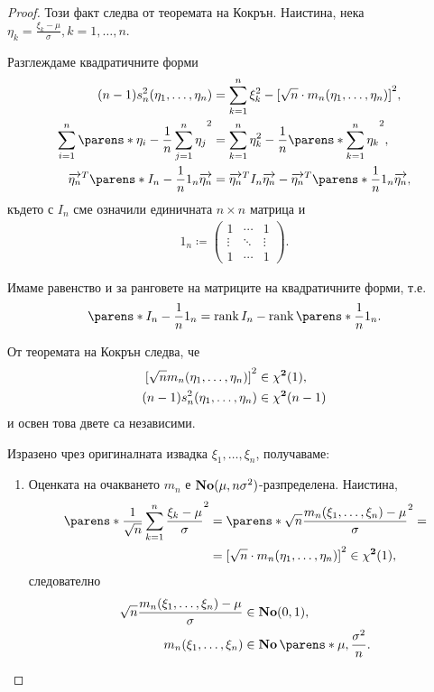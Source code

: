 \documentclass{../../common/topic}
\begin{document}
\begin{proof}
  Този факт следва от теоремата на Кокрън. Наистина, нека \( \eta_k = \frac {\xi_k - \mu} \sigma, k = 1, \ldots, n \).

  Разглеждаме квадратичните форми
  \begin{align*}
    (n-1) s_n^2(\eta_1, \ldots, \eta_n)
    &=
    \sum_{k=1}^n \xi_k^2 - {[\sqrt n \cdot m_n(\eta_1, \ldots, \eta_n)]}^2,
    \\
    \sum_{i=1}^n {\parens*{\eta_i - \frac 1 n \sum_{j=1}^n \eta_j }}^2
    &=
    \sum_{k=1}^n \eta_k^2 - \frac 1 n {\parens*{\sum_{k=1}^n \eta_k }}^2,
    \\
    \vect{\eta_n}^T \parens*{I_n - \frac 1 n 1_n } \vect{\eta_n}
    &=
    \vect{\eta_n}^T I_n \vect{\eta_n} - \vect{\eta_n}^T \parens*{\frac 1 n 1_n } \vect{\eta_n},
  \end{align*}
  където с \( I_n \) сме означили единичната \( n \times n \) матрица и
  \begin{align*}
    1_n
    \coloneqq
    \begin{pmatrix}
      1 & \cdots & 1 \\
      \vdots & \ddots & \vdots \\
      1 & \cdots & 1
    \end{pmatrix}.
  \end{align*}

  Имаме равенство и за ранговете на матриците на квадратичните форми, т.е.
  \begin{equation*}
    \parens*{I_n - \frac 1 n 1_n } = \rank I_n - \rank \parens*{ \frac 1 n 1_n }.
  \end{equation*}

  От теоремата на Кокрън следва, че
  \begin{align*}
    {[\sqrt n m_n(\eta_1, \ldots, \eta_n)]}^2 &\in \operatorname{\mathbf{\chi^2}}(1),
    \\
    (n-1) s_n^2(\eta_1, \ldots, \eta_n) &\in \operatorname{\mathbf{\chi^2}}(n - 1)
  \end{align*}
  и освен това двете са независими.

  Изразено чрез оригиналната извадка \( \xi_1, \ldots, \xi_n \), получаваме:
  \begin{enumerate}
    \item Оценката на очакването \( m_n \) е \( \operatorname{\mathbf{No}}(\mu, n \sigma^2) \)-разпределена. Наистина,
    \begin{align*}
      {\parens*{\frac 1 {\sqrt n} \sum_{k=1}^n \frac {\xi_k - \mu} \sigma }}^2
      &=
      {\parens*{ \sqrt n \frac {m_n(\xi_1, \ldots, \xi_n) - \mu} \sigma }}^2
      = \\ &=
      {[\sqrt n \cdot m_n(\eta_1, \ldots, \eta_n)]}^2
      \in
      \distr{\chi^2}(1),
    \end{align*}
    следователно
    \begin{align*}
      \sqrt n \frac {m_n(\xi_1, \ldots, \xi_n) - \mu} \sigma &\in \distr{No}(0, 1),
      \\
      m_n(\xi_1, \ldots, \xi_n) &\in \distr{No} \parens*{\mu, \frac {\sigma^2} n }.
    \end{align*}


\end{enumerate}
\end{proof}
\end{document}
